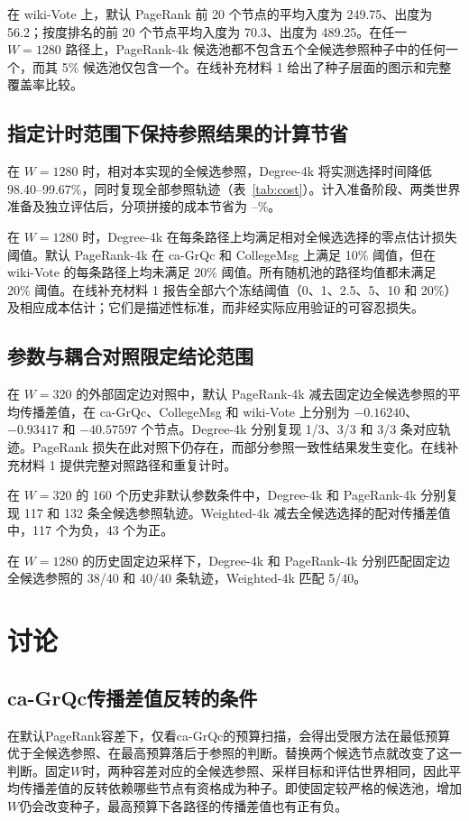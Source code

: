 \documentclass[smallextended]{svjour3}
\begin{document}
在 wiki-Vote 上，默认 PageRank 前 20 个节点的平均入度为 249.75、出度为 56.2；按度排名的前 20 个节点平均入度为 70.3、出度为 489.25。在任一 $W=1280$ 路径上，PageRank-4k 候选池都不包含五个全候选参照种子中的任何一个，而其 5\% 候选池仅包含一个。在线补充材料 1 给出了种子层面的图示和完整覆盖率比较。

\subsection{指定计时范围下保持参照结果的计算节省}
在 $W=1280$ 时，相对本实现的全候选参照，Degree-4k 将实测选择时间降低 98.40--99.67\%，同时复现全部参照轨迹（表~\ref{tab:cost}）。计入准备阶段、两类世界准备及独立评估后，分项拼接的成本节省为 \CollegeDegreeSaving{}--\WikiDegreeSaving{}\%。


在 $W=1280$ 时，Degree-4k 在每条路径上均满足相对全候选选择的零点估计损失阈值。默认 PageRank-4k 在 ca-GrQc 和 CollegeMsg 上满足 10\% 阈值，但在 wiki-Vote 的每条路径上均未满足 20\% 阈值。所有随机池的路径均值都未满足 20\% 阈值。在线补充材料 1 报告全部六个冻结阈值（0、1、2.5、5、10 和 20\%）及相应成本估计；它们是描述性标准，而非经实际应用验证的可容忍损失。

\subsection{参数与耦合对照限定结论范围}

在 $W=320$ 的外部固定边对照中，默认 PageRank-4k 减去固定边全候选参照的平均传播差值，在 ca-GrQc、CollegeMsg 和 wiki-Vote 上分别为 $-0.16240$、$-0.93417$ 和 $-40.57597$ 个节点。Degree-4k 分别复现 1/3、3/3 和 3/3 条对应轨迹。PageRank 损失在此对照下仍存在，而部分参照一致性结果发生变化。在线补充材料 1 提供完整对照路径和重复计时。

在 $W=320$ 的 160 个历史非默认参数条件中，Degree-4k 和 PageRank-4k 分别复现 117 和 132 条全候选参照轨迹。Weighted-4k 减去全候选选择的配对传播差值中，117 个为负，43 个为正。

在 $W=1280$ 的历史固定边采样下，Degree-4k 和 PageRank-4k 分别匹配固定边全候选参照的 38/40 和 40/40 条轨迹，Weighted-4k 匹配 5/40。
\FloatBarrier

\section{讨论}
\subsection{ca-GrQc传播差值反转的条件}
在默认PageRank容差下，仅看ca-GrQc的预算扫描，会得出受限方法在最低预算优于全候选参照、在最高预算落后于参照的判断。替换两个候选节点就改变了这一判断。固定$W$时，两种容差对应的全候选参照、采样目标和评估世界相同，因此平均传播差值的反转依赖哪些节点有资格成为种子。即使固定较严格的候选池，增加$W$仍会改变种子，最高预算下各路径的传播差值也有正有负。
\end{document}
